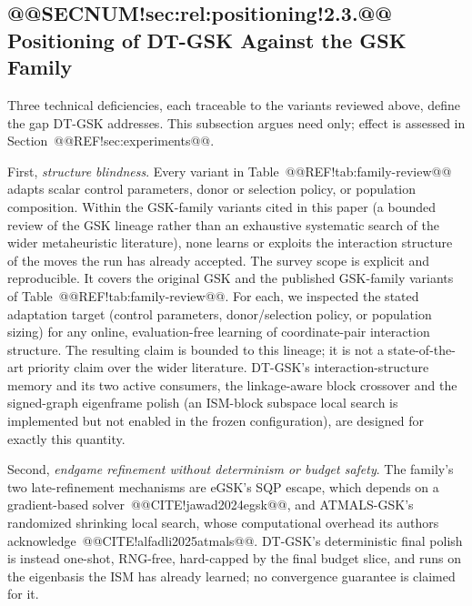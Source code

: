 \documentclass[10pt,a4paper]{article}
\newcommand{\dtgsk}{DT-GSK}
\newcommand{\atmals}{ATMALS-GSK}
\newcommand{\egsk}{eGSK}
\begin{document}
\subsection{@@SECNUM!sec:rel:positioning!2.3.@@ Positioning of \dtgsk{} Against the GSK Family}\label{sec:rel:positioning}


Three technical deficiencies, each traceable to the variants reviewed
above, define the gap \dtgsk{} addresses. This subsection argues need
only; effect is assessed in Section~@@REF!sec:experiments@@.

First, \emph{structure blindness}. Every variant in
Table~@@REF!tab:family-review@@ adapts scalar control parameters, donor or
selection policy, or population composition. Within the GSK-family variants
cited in this paper (a bounded review of the GSK lineage rather than an
exhaustive systematic search of the wider metaheuristic literature), none
learns or exploits the interaction
structure of the moves the run has already accepted. The survey scope is explicit and reproducible. It covers the original GSK
and the published GSK-family variants of Table~@@REF!tab:family-review@@. For
each, we inspected the stated adaptation target (control parameters,
donor/selection policy, or population sizing) for any online,
evaluation-free learning of coordinate-pair interaction structure. The
resulting claim is bounded to this lineage; it is not a state-of-the-art
priority claim over the wider literature. 
\dtgsk{}'s interaction-structure memory and its two active consumers,
the linkage-aware block crossover and the signed-graph eigenframe polish
(an ISM-block subspace local search is implemented but not enabled
in the frozen configuration), are designed for exactly this quantity.

Second, \emph{endgame refinement without determinism or budget safety}.
The family's two late-refinement mechanisms are \egsk{}'s SQP escape,
which depends on a gradient-based solver~@@CITE!jawad2024egsk@@, and
\atmals{}'s randomized shrinking local search, whose computational
overhead its authors acknowledge~@@CITE!alfadli2025atmals@@. \dtgsk{}'s
deterministic final polish is instead one-shot, RNG-free, hard-capped by
the final budget slice, and runs on the eigenbasis the ISM has already
learned; no convergence guarantee is claimed for it.
\end{document}
